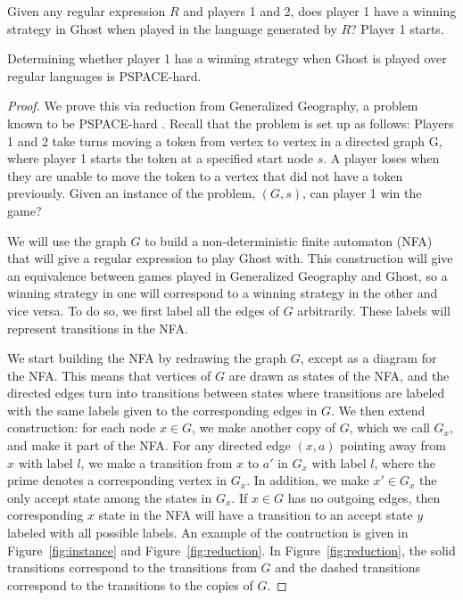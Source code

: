 \documentclass[runningheads,a4paper]{llncs}
\begin{document}
Given any regular expression $R$ and players 1 and 2, does player 1 have a winning strategy in Ghost when played in the language generated by $R$? Player 1 starts.
\begin{theorem} Determining whether player 1 has a winning strategy when Ghost is played over regular languages is PSPACE-hard.
\end{theorem}
\begin{proof} We prove this via reduction from Generalized Geography, a problem known to be PSPACE-hard \cite{theoryofcomp}. Recall that the problem is set up as follows:
Players 1 and 2 take turns moving a token from vertex to vertex in a directed graph G, where player 1 starts the token at a specified start node $s$. A player loses when they are unable to move the token to a vertex that did not have a token previously. Given an instance of the problem, $(G,s)$, can player 1 win the game?

We will use the graph $G$ to build a non-deterministic finite automaton (NFA) that will give a regular expression to play Ghost with. This construction will give an equivalence between games played in Generalized Geography and Ghost, so a winning strategy in one will correspond to a winning strategy in the other and vice versa. To do so, we first label all the edges of $G$ arbitrarily. These labels will represent transitions in the NFA.

We start building the NFA by redrawing the graph $G$, except as a diagram for the NFA. This means that vertices of $G$ are drawn as states of the NFA, and the directed edges turn into transitions between states where transitions are labeled with the same labels given to the corresponding edges in $G$. We then extend construction: for each node $x\in G$, we make another copy of $G$, which we call $G_x$, and make it part of the NFA. For any directed edge $(x,a)$ pointing away from $x$ with label $l$, we make a transition from $x$ to $a'$ in $G_x$ with label $l$, where the prime denotes a corresponding vertex in $G_x$. In addition, we make $x' \in G_x$  the only accept state among the states in $G_x$. If $x\in G$ has no outgoing edges, then corresponding $x$ state in the NFA will have a transition to an accept state $y$ labeled with all possible labels. An example of the contruction is given in Figure~\ref{fig:instance} and Figure~\ref{fig:reduction}. In Figure~\ref{fig:reduction}, the solid transitions correspond to the transitions from $G$ and the dashed transitions correspond to the transitions to the copies of $G$.


\end{proof}
\end{document}
